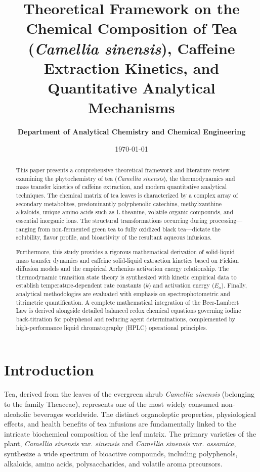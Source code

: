 \documentclass[11pt,a4paper]{article}
\title{\textbf{Theoretical Framework on the Chemical Composition of Tea (\textit{Camellia sinensis}), Caffeine Extraction Kinetics, and Quantitative Analytical Mechanisms}}
\author{\textbf{Department of Analytical Chemistry and Chemical Engineering}}
\date{\today}
\begin{document}
\maketitle

\begin{abstract}
This paper presents a comprehensive theoretical framework and literature review examining the phytochemistry of tea (\textit{Camellia sinensis}), the thermodynamics and mass transfer kinetics of caffeine extraction, and modern quantitative analytical techniques. The chemical matrix of tea leaves is characterized by a complex array of secondary metabolites, predominantly polyphenolic catechins, methylxanthine alkaloids, unique amino acids such as L-theanine, volatile organic compounds, and essential inorganic ions. The structural transformations occurring during processing—ranging from non-fermented green tea to fully oxidized black tea—dictate the solubility, flavor profile, and bioactivity of the resultant aqueous infusions. 

Furthermore, this study provides a rigorous mathematical derivation of solid-liquid mass transfer dynamics and caffeine solid-liquid extraction kinetics based on Fickian diffusion models and the empirical Arrhenius activation energy relationship. The thermodynamic transition state theory is synthesized with kinetic empirical data to establish temperature-dependent rate constants ($k$) and activation energy ($E_a$). Finally, analytical methodologies are evaluated with emphasis on spectrophotometric and titrimetric quantification. A complete mathematical integration of the Beer-Lambert Law is derived alongside detailed balanced redox chemical equations governing iodine back-titration for polyphenol and reducing agent determinations, complemented by high-performance liquid chromatography (HPLC) operational principles.
\end{abstract}

\section{Introduction}

Tea, derived from the leaves of the evergreen shrub \textit{Camellia sinensis} (belonging to the family Theaceae), represents one of the most widely consumed non-alcoholic beverages worldwide. The distinct organoleptic properties, physiological effects, and health benefits of tea infusions are fundamentally linked to the intricate biochemical composition of the leaf matrix. The primary varieties of the plant, \textit{Camellia sinensis} var. \textit{sinensis} and \textit{Camellia sinensis} var. \textit{assamica}, synthesize a wide spectrum of bioactive compounds, including polyphenols, alkaloids, amino acids, polysaccharides, and volatile aroma precursors.
\end{document}
